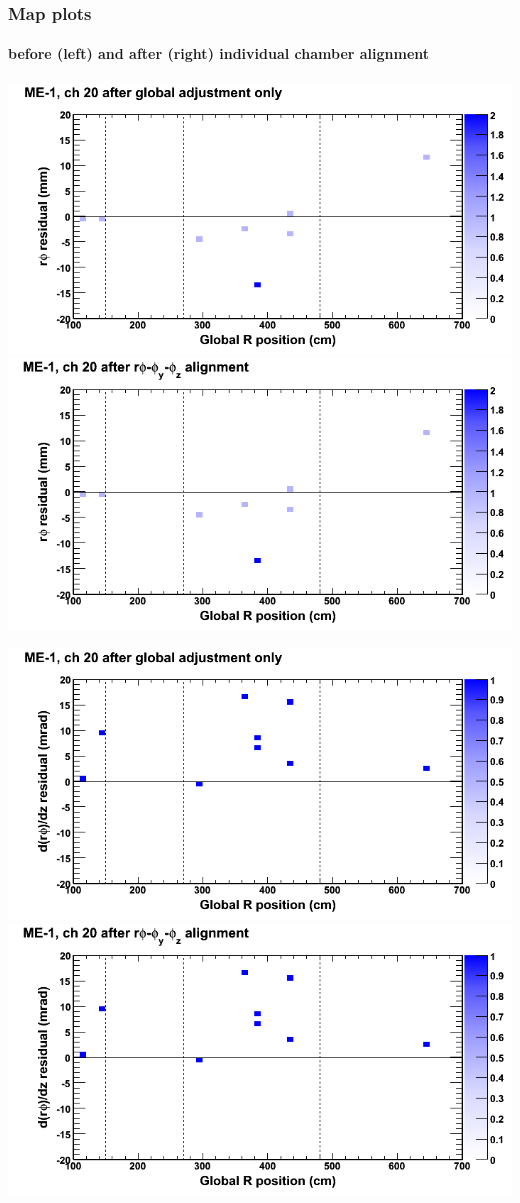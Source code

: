 \documentclass[compress]{beamer}
\begin{document}
\begin{frame}
\frametitle{Map plots}
\framesubtitle{before (left) and after (right) individual chamber alignment}
\includegraphics[width=0.5\linewidth]{ringmapplots_3dof/before_CSCvsr_mem1ch20_x.png} \includegraphics[width=0.5\linewidth]{ringmapplots_3dof/after_CSCvsr_mem1ch20_x.png}

\includegraphics[width=0.5\linewidth]{ringmapplots_3dof/before_CSCvsr_mem1ch20_dxdz.png} \includegraphics[width=0.5\linewidth]{ringmapplots_3dof/after_CSCvsr_mem1ch20_dxdz.png}
\end{frame}
\end{document}
